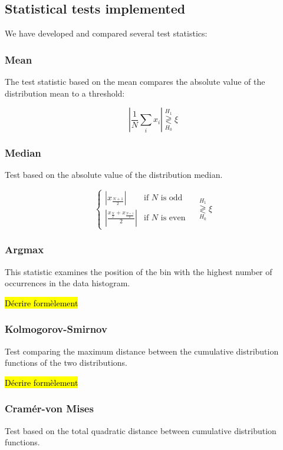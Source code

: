 \documentclass{article}
\begin{document}
\subsection{Statistical tests implemented}

We have developed and compared several test statistics:

\subsubsection{Mean}

The test statistic based on the mean compares the absolute value of the distribution mean to a threshold:

\begin{equation}
    \left|\frac{1}{N}\sum_i x_i \right| \stackrel{H_1}{\underset{H_0}{\gtrless}} \xi
\end{equation}

\subsubsection{Median}
Test based on the absolute value of the distribution median.

\begin{equation}
\begin{cases}
\left| x_{\frac{N+1}{2}} \right| & \text{if }N\text{ is odd} \\
\left| \frac{x_{\frac{N}{2}} + x_{\frac{N+1}{2}}}{2} \right|  & \text{if }N\text{ is even}
\end{cases}
\quad\stackrel{H_1}{\underset{H_0}{\gtrless}} \xi
\end{equation}

\subsubsection{Argmax}
This statistic examines the position of the bin with the highest number of occurrences in the data histogram.

\hl{Décrire formèlement}

\subsubsection{Kolmogorov-Smirnov}
Test comparing the maximum distance between the cumulative distribution functions of the two distributions.

\hl{Décrire formèlement}

\subsubsection{Cramér-von Mises}
Test based on the total quadratic distance between cumulative distribution functions.
\end{document}
